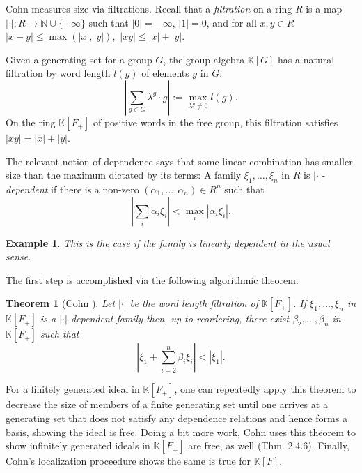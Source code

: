 \documentclass[11pt,letterpaper]{amsart}
\newtheorem{theorem}{Theorem}
\newtheorem*{example}{Example}
\begin{document}
Cohn measures size via filtrations. Recall that a {{\it filtration}} on a ring $R$ is a map $|\cdot|
: R\rightarrow \mathbb{N}\cup\{-\infty\}$  such that $|0|=-\infty$, $|1| = 0$, and for all $x,y\in R$
$
|x-y|\leqslant\max(|x|,|y|),
$
$
|xy|\leqslant|x| + |y|.
$

Given a generating set for a group $G$, the group algebra $\mathbb K[G]$ has a natural filtration by word length $l(g)$ of elements $g$ in $G$:
$$
\left|\sum_{g\in G}\lambda^g\cdot g\right|:=\max_{\lambda^g\not=0}l(g).
$$
On the ring $\mathbb K[F_+]$ of positive words in the free group, this filtration satisfies $|xy|=|x|+|y|$. 

The relevant notion of dependence says that some linear combination has smaller size than the maximum dictated by its terms: A family $\xi_1, \dots, \xi_n$ in $R$ is {\it $|\cdot|$-dependent} if there is a non-zero $(\alpha_1, \ldots, \alpha_n)\in R^n$ such that 
$$
\left|\sum_i \alpha_i \xi_i\right|<\max_i\left|\alpha_i\xi_i\right|.
$$
\begin{example}
This is the case if the family is linearly dependent in the usual sense.
\end{example}
The first step is accomplished via the following algorithmic theorem.
\begin{theorem}[Cohn \cite{cohnbook}]
Let $|\cdot|$ be the word length filtration of $\mathbb K[F_+]$. If $\xi_1,\dots,\xi_n$ in $\mathbb K[F_+]$ is a $|\cdot|$-dependent family then, up to reordering, there exist $\beta_2,\dots,\beta_n$ in $\mathbb K[F_+]$ such that 
$$
\left|\xi_1 + \sum_{i = 2}^n \beta_i \xi_i\right| < | \xi_1|.
$$
\end{theorem}
For a finitely generated ideal in $\mathbb K[F_+]$, one can repeatedly apply this theorem to decrease the size of members of a finite generating set until one arrives at a generating set that does not satisfy any dependence relations and hence forms a basis, showing the ideal is free. Doing a bit more work, Cohn uses this theorem to show infinitely generated ideals in $\mathbb K[F_+]$ are free, as well (Thm. 2.4.6). Finally, Cohn's localization proceedure shows the same is true for $\mathbb K[F]$. 

\end{document}
